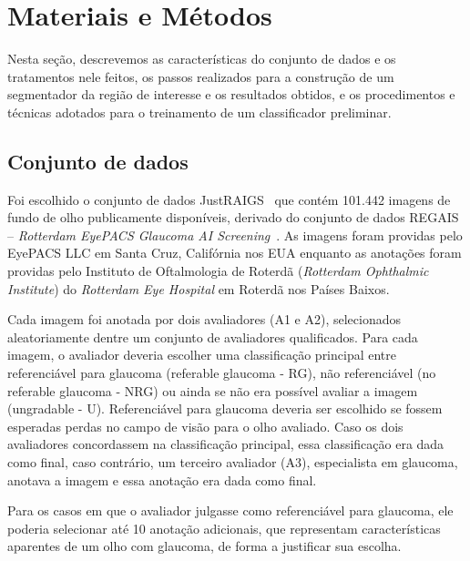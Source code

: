 \documentclass[12pt]{article}
\begin{document}
\bigskip


\bigskip

\section{Materiais e Métodos}
\label{sec:methodology}

Nesta seção, descrevemos as características do conjunto de dados e os tratamentos nele feitos, os passos realizados para a construção de um segmentador da região de interesse e os resultados obtidos, e os procedimentos e técnicas adotados para o treinamento de um classificador preliminar.

\subsection{Conjunto de dados}
\label{sec:dataset}

Foi escolhido o conjunto de dados JustRAIGS~\cite{justraigs} que contém 101.442 imagens de fundo de olho publicamente disponíveis, derivado do conjunto de dados REGAIS – \emph{Rotterdam EyePACS Glaucoma AI Screening}~\cite{justraigs_article}. As imagens foram providas pelo EyePACS LLC em Santa Cruz, Califórnia nos EUA enquanto as anotações foram providas pelo Instituto de Oftalmologia de Roterdã (\emph{Rotterdam Ophthalmic Institute}) do \emph{Rotterdam Eye Hospital} em Roterdã nos Países Baixos.

Cada imagem foi anotada por dois avaliadores (A1 e A2), selecionados aleatoriamente dentre um conjunto de avaliadores qualificados. 
Para cada imagem, o avaliador deveria escolher uma classificação principal entre referenciável para glaucoma (referable glaucoma - RG), não referenciável (no referable glaucoma - NRG) ou ainda se não era possível avaliar a imagem (ungradable - U). Referenciável para glaucoma deveria ser escolhido se fossem esperadas perdas no campo de visão para o olho avaliado.
Caso os dois avaliadores concordassem na classificação principal, essa classificação era dada como final, caso contrário, um terceiro avaliador (A3), especialista em glaucoma, anotava a imagem e essa anotação era dada como final.~\cite{justraigs_article}

Para os casos em que o avaliador julgasse como referenciável para glaucoma, ele poderia selecionar até 10 anotação adicionais, que representam características aparentes de um olho com glaucoma, de forma a justificar sua escolha. \cite{justraigs_article}
\end{document}
